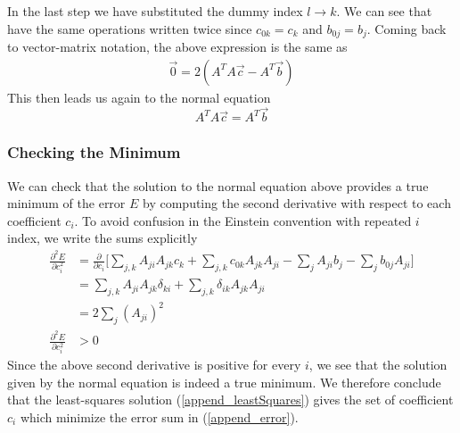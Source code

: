 In the last step we have substituted the dummy index $l\rightarrow k$. We can see that have the same operations written twice since $c_{0k} = c_k$ and $b_{0j}=b_j$. Coming back to vector-matrix notation, the above expression is the same as
\begin{align}
	\vec{0} = 2\left(A^T A \vec{c} - A^T \vec{b}\right)
\end{align}
This then leads us again to the normal equation
\begin{equation}
	A^T A \vec{c} = A^T \vec{b}
\end{equation}

\subsubsection{Checking the Minimum}
We can check that the solution to the normal equation above provides a true minimum of the error $E$ by computing the second derivative with respect to each coefficient $c_i$. To avoid confusion in the Einstein convention with repeated $i$ index, we write the sums explicitly
\begin{align}
	\frac{\partial^2 E}{\partial c_i^2}
	&= \frac{\partial}{\partial c_i} \Big[\sum_{j,k}A_{ji}A_{jk}c_k + \sum_{j,k}c_{0k}A_{jk}A_{ji} - \sum_{j}A_{ji}b_j - \sum_{j}b_{0j}A_{ji}\Big] \nonumber\\
	&= \sum_{j,k}A_{ji}A_{jk}\delta_{ki} + \sum_{j,k}\delta_{ik}A_{jk}A_{ji} \nonumber\\
	&= 2\sum_{j}\left(A_{ji}\right)^2 \nonumber\\
	\frac{\partial^2 E}{\partial c_i^2} &> 0
\end{align}
Since the above second derivative is positive for every $i$, we see that the solution given by the normal equation is indeed a true minimum. We therefore conclude that the least-squares solution (\ref{append_leastSquares}) gives the set of coefficient $c_i$ which minimize the error sum in (\ref{append_error}).


